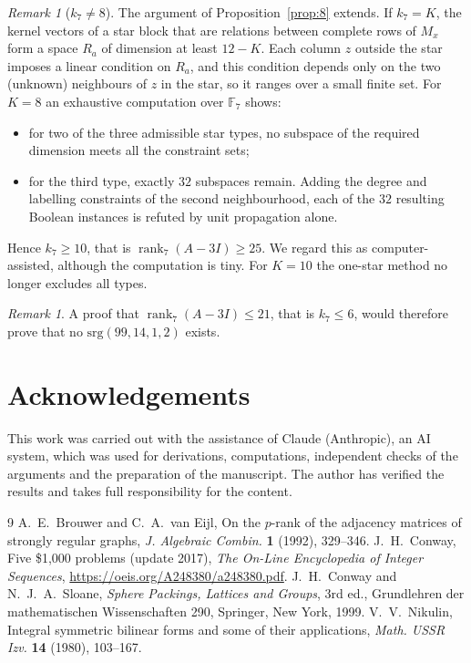 \documentclass[11pt]{amsart}
\theoremstyle{remark}
\newtheorem{remark}[theorem]{Remark}
\newcommand{\F}{\mathbb{F}}
\DeclareMathOperator{\rk}{rank}
\begin{document}
\begin{remark}[$k_7\ne8$]\label{rem:25}
The argument of Proposition~\ref{prop:8} extends. If $k_7=K$, the kernel vectors of a star block that are relations
between complete rows of $M_x$ form a space $R_a$ of dimension at least $12-K$. Each column $z$ outside the star imposes
a linear condition on $R_a$, and this condition depends only on the two (unknown) neighbours of $z$ in the star, so it
ranges over a small finite set. For $K=8$ an exhaustive computation over $\F_7$ shows:
\begin{itemize}
\item for two of the three admissible star types, no subspace of the required dimension meets all the constraint sets;
\item for the third type, exactly $32$ subspaces remain. Adding the degree and labelling constraints of the second
neighbourhood, each of the $32$ resulting Boolean instances is refuted by unit propagation alone.
\end{itemize}
Hence $k_7\ge10$, that is $\rk_7(A-3I)\ge25$. We regard this as computer-assisted, although the computation is tiny. For
$K=10$ the one-star method no longer excludes all types.
\end{remark}

\begin{remark}
A proof that $\rk_7(A-3I)\le 21$, that is $k_7\le6$, would therefore prove that no $\mathrm{srg}(99,14,1,2)$ exists.
\end{remark}

\section*{Acknowledgements}
This work was carried out with the assistance of Claude (Anthropic), an AI system, which was used for derivations,
computations, independent checks of the arguments and the preparation of the manuscript. The author has verified the
results and takes full responsibility for the content.

\begin{thebibliography}{9}
 A.~E.~Brouwer and C.~A.~van Eijl, On the $p$-rank of the adjacency matrices of strongly regular graphs,
\emph{J. Algebraic Combin.} \textbf{1} (1992), 329--346.
 J.~H.~Conway, Five \$1{,}000 problems (update 2017), \emph{The On-Line Encyclopedia of Integer Sequences},
\url{https://oeis.org/A248380/a248380.pdf}.
 J.~H.~Conway and N.~J.~A.~Sloane, \emph{Sphere Packings, Lattices and Groups}, 3rd ed., Grundlehren der
mathematischen Wissenschaften 290, Springer, New York, 1999.
 V.~V.~Nikulin, Integral symmetric bilinear forms and some of their applications,
\emph{Math. USSR Izv.} \textbf{14} (1980), 103--167.
\end{thebibliography}
\end{document}
